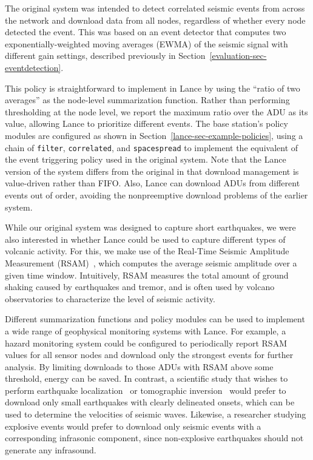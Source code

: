 The original system was intended to detect correlated seismic events from
across the network and download data from all nodes, regardless of whether
every node detected the event. This was based on an event detector that
computes two exponentially-weighted moving averages (EWMA) of the seismic
signal with different gain settings, described previously in
Section~\ref{evaluation-sec-eventdetection}.

This policy is straightforward to implement in Lance by using the ``ratio of
two averages'' as the node-level summarization function. Rather than
performing thresholding at the node level, we report the maximum ratio over
the ADU as its value, allowing Lance to prioritize different events. The base
station's policy modules are configured as shown in
Section~\ref{lance-sec-example-policies}, using a chain of \texttt{filter},
\texttt{correlated}, and \texttt{spacespread} to implement the equivalent of
the event triggering policy used in the original system. Note that the Lance
version of the system differs from the original in that download management
is value-driven rather than FIFO. Also, Lance can download ADUs from
different events out of order, avoiding the nonpreemptive download problems
of the earlier system.

While our original system was designed to capture short earthquakes, we were
also interested in whether Lance could be used to capture different types of
volcanic activity. For this, we make use of the Real-Time Seismic Amplitude
Measurement (RSAM)~\cite{rsam}, which computes the average seismic amplitude
over a given time window. Intuitively, RSAM measures the total amount of
ground shaking caused by earthquakes and tremor, and is often used by volcano
observatories to characterize the level of seismic activity.

Different summarization functions and policy modules can be used to implement
a wide range of geophysical monitoring systems with Lance. For example, a
hazard monitoring system could be configured to periodically report RSAM
values for all sensor nodes and download only the strongest events for
further analysis. By limiting downloads to those ADUs with RSAM above some
threshold, energy can be saved. In contrast, a scientific study that wishes
to perform earthquake localization~\cite{aki-richards-80} or tomographic
inversion~\cite{lees-lindley-94} would prefer to download only small
earthquakes with clearly delineated onsets, which can be used to determine
the velocities of seismic waves. Likewise, a researcher studying explosive
events would prefer to download only seismic events with a corresponding
infrasonic component, since non-explosive earthquakes should not generate any
infrasound.

